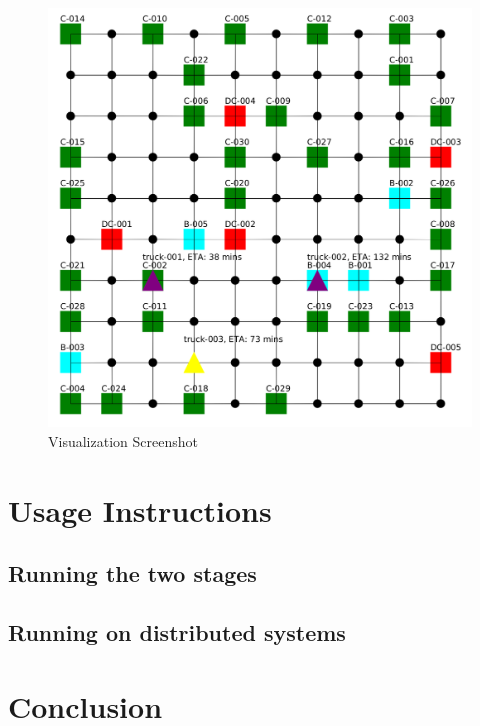 \documentclass[11pt, a4paper]{article}
\begin{document}
\begin{figure}[h!]
	\centering
	\includegraphics[width=\textwidth]{Visualization.png}
	\caption{Visualization Screenshot}
	\label{PackagingArchitecture}
\end{figure}

\section{Usage Instructions}

\subsection{Running the two stages}

\subsection{Running on distributed systems}

\section{Conclusion}
\end{document}
